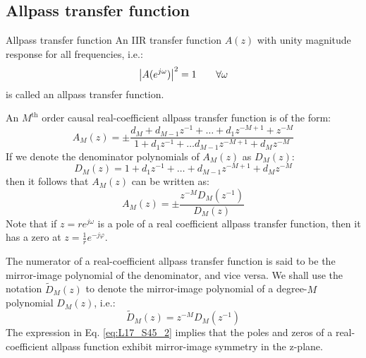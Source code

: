 \documentclass[../../main/main.tex]{subfiles}
\begin{document}
\subsection{Allpass transfer function}
\begin{definition}{Allpass transfer function}{}
    An IIR transfer function \( A(z) \) with unity magnitude response for all frequencies, i.e.:
    \begin{equation}
        \abs{A(e^{j\omega})}^{2}
        =
        1
        \qquad
        \forall \omega
        \label{eq:L17_S44_1}
    \end{equation}
    is called an allpass transfer function.
\end{definition}

An \( M^{\text{th}} \) order causal real-coefficient allpass transfer function is of the form:
\begin{equation}
    A_{M}(z)
    =
    \pm \frac{d_{M} + d_{M-1}z^{-1} + \dots + d_{1}z^{-M+1} + z^{-M}}{1 + d_{1}z^{-1} + \dots d_{M-1}z^{-M+1} + d_{M}z^{-M}}
    \label{eq:L17_S44_2}
\end{equation}
If we denote the denominator polynomials of \( A_{M}(z) \) as \( D_{M}(z) \):
\begin{equation}
    D_{M}(z)
    =
    1 + d_{1}z^{-1} + \dots + d_{M-1}z^{-M+1} + d_{M}z^{-M}
    \label{eq:L17_S45_1}
\end{equation}
then it follows that \( A_{M}(z) \) can be written as:
\begin{equation}
    A_{M}(z)
    =
    \pm \frac{z^{-M}D_{M}(z^{-1})}{D_{M}(z)}
    \label{eq:L17_S45_2}
\end{equation}
Note that if \( z = re^{j\omega} \) is a pole of a real coefficient allpass transfer function, then it has a zero at \( z = \frac{1}{r} e^{-j \varphi} \).

The numerator of a real-coefficient allpass transfer function is said to be the mirror-image polynomial of the denominator, and vice versa. We shall use the notation \( \widetilde{D}_{M}(z) \) to denote the mirror-image polynomial of a degree-\( M \) polynomial \( D_{M}(z) \), i.e.:
\begin{equation}
    \widetilde{D}_{M}(z)
    =
    z^{-M} D_{M}(z^{-1})
    \label{eq:L17_S46_1}
\end{equation}
The expression in Eq. \ref{eq:L17_S45_2} implies that the poles and zeros of a real-coefficient allpass function exhibit mirror-image symmetry in the z-plane.

\begin{example}{Allpass transfer function}{}
    \begin{equation}
        A_{3}(z)
        \frac{-0.2 + 0.81z^{-1} + 0.4z^{-2} + z^{-3}}{1 + 0.4z^{-1} + 0.18z^{-2} - 0.2z^{-3}}
        \label{eq:L17_S47_2}
    \end{equation}

    \begin{center}
        \texttt{[image: \\figpath\{17]}/17_images/S47_1.pdf}
    \end{center}
\end{example}
\end{document}
